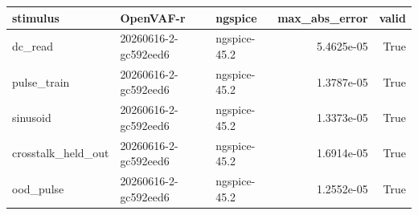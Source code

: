 \begin{tabular}{lllrr}
\toprule
stimulus & OpenVAF-r & ngspice & max\_abs\_error & valid \\
\midrule
dc\_read & 20260616-2-gc592eed6 & ngspice-45.2 & 5.4625e-05 & True \\
pulse\_train & 20260616-2-gc592eed6 & ngspice-45.2 & 1.3787e-05 & True \\
sinusoid & 20260616-2-gc592eed6 & ngspice-45.2 & 1.3373e-05 & True \\
crosstalk\_held\_out & 20260616-2-gc592eed6 & ngspice-45.2 & 1.6914e-05 & True \\
ood\_pulse & 20260616-2-gc592eed6 & ngspice-45.2 & 1.2552e-05 & True \\
\bottomrule
\end{tabular}
